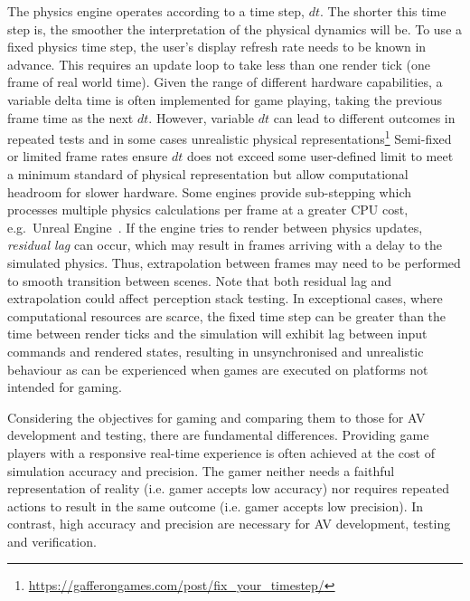The physics engine operates according to a time step, $dt$. The shorter this time step is, the smoother the interpretation of the physical dynamics will be. To use a fixed physics time step, the user's display refresh rate needs to be known in advance. This requires an update loop to take less than one render tick (one frame of real world time). Given the range of different hardware capabilities, a variable delta time is often implemented for game playing, taking the previous frame time as the next $dt$. However, variable $dt$ can lead to different outcomes in repeated tests and in some cases unrealistic physical representations\DIFdelbegin {}\DIFdelend \DIFaddbegin \footnote{\url{https://gafferongames.com/post/fix_your_timestep/}}\DIFaddend %
Semi-fixed or limited frame rates ensure $dt$ does not exceed some user-defined limit to meet a minimum standard of physical representation but allow computational headroom for slower hardware. Some engines provide sub-stepping which processes multiple physics calculations per frame at a greater CPU cost, e.g.\ Unreal Engine~\cite{UE4_substepping}. If the engine tries to render between physics updates, \textit{residual lag} can occur, which may result in frames arriving with a delay to the simulated physics. Thus, extrapolation between frames may need to be performed to smooth transition between scenes. Note that both residual lag and extrapolation could affect perception stack testing. In exceptional cases, where computational resources are scarce, the fixed time step can be greater than the time between render ticks and the simulation will exhibit lag between input commands and rendered states, resulting in unsynchronised and unrealistic behaviour as can be experienced when games are executed on platforms not intended for gaming. 

Considering the objectives for gaming and comparing them to those for AV development and testing, there are fundamental differences. Providing game players with a responsive real-time experience is often achieved at the cost of simulation accuracy and precision.
% 
The gamer neither needs a faithful representation of reality (i.e. gamer accepts low accuracy) nor requires repeated actions to result in the same outcome (i.e. gamer accepts low precision). In contrast, high accuracy and precision are necessary for AV development, testing and verification.

